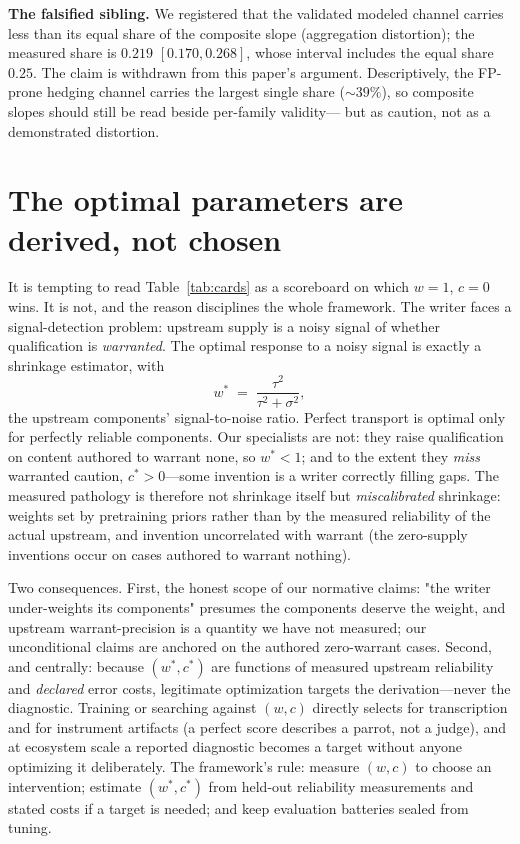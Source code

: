 \documentclass[11pt]{article}
\newcommand{\ww}{\ensuremath{w}}
\newcommand{\cc}{\ensuremath{c}}
\begin{document}
\textbf{The falsified sibling.} We registered that the validated modeled
channel carries less than its equal share of the composite slope
(aggregation distortion); the measured share is $0.219$
$[0.170, 0.268]$, whose interval includes the equal share $0.25$. The
claim is withdrawn from this paper's argument. Descriptively, the
FP-prone hedging channel carries the largest single share ($\sim 39\%$),
so composite slopes should still be read beside per-family validity---
but as caution, not as a demonstrated distortion.

\section{The optimal parameters are derived, not chosen}
\label{sec:optimal}

It is tempting to read Table~\ref{tab:cards} as a scoreboard on which
$\ww{=}1$, $\cc{=}0$ wins. It is not, and the reason disciplines the whole
framework. The writer faces a signal-detection problem: upstream supply is
a noisy signal of whether qualification is \emph{warranted}. The optimal
response to a noisy signal is exactly a shrinkage estimator, with
\begin{equation}
\ww^{*} \;=\; \frac{\tau^{2}}{\tau^{2}+\sigma^{2}},
\end{equation}
the upstream components' signal-to-noise ratio. Perfect transport is
optimal only for perfectly reliable components. Our specialists are not:
they raise qualification on content authored to warrant none, so
$\ww^{*}<1$; and to the extent they \emph{miss} warranted caution,
$\cc^{*}>0$---some invention is a writer correctly filling gaps. The
measured pathology is therefore not shrinkage itself but
\emph{miscalibrated} shrinkage: weights set by pretraining priors rather
than by the measured reliability of the actual upstream, and invention
uncorrelated with warrant (the zero-supply inventions occur on cases
authored to warrant nothing).

Two consequences. First, the honest scope of our normative claims:
"the writer under-weights its components" presumes the components deserve
the weight, and upstream warrant-precision is a quantity we have not
measured; our unconditional claims are anchored on the authored zero-warrant
cases. Second, and centrally: because $(\ww^{*},\cc^{*})$ are functions of
measured upstream reliability and \emph{declared} error costs, legitimate
optimization targets the derivation---never the diagnostic. Training or
searching against $(\ww,\cc)$ directly selects for transcription and for
instrument artifacts (a perfect score describes a parrot, not a judge), and
at ecosystem scale a reported diagnostic becomes a target without anyone
optimizing it deliberately. The framework's rule: measure $(\ww,\cc)$ to
choose an intervention; estimate $(\ww^{*},\cc^{*})$ from held-out
reliability measurements and stated costs if a target is needed; and keep
evaluation batteries sealed from tuning.
\end{document}
